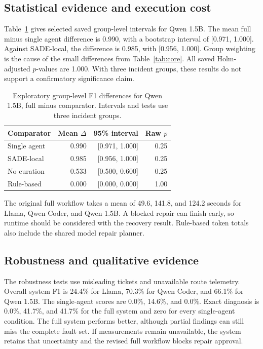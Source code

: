 \documentclass[pdflatex,sn-mathphys-num,iicol]{sn-jnl}
\begin{document}
\subsection{Statistical evidence and execution cost}
Table~\ref{tab:stats} gives selected saved group-level intervals for Qwen 1.5B. The mean full minus single agent difference is 0.990, with a bootstrap interval of [0.971, 1.000]. Against SADE-local, the difference is 0.985, with [0.956, 1.000]. Group weighting is the cause of the small differences from Table~\ref{tab:core}. All saved Holm-adjusted $p$-values are 1.000. With three incident groups, these results do not support a confirmatory significance claim.

\begin{table}[t]
\caption{Exploratory group-level F1 differences for Qwen 1.5B, full minus comparator. Intervals and tests use three incident groups.}\label{tab:stats}
\centering\small
\begin{tabular}{@{}lrrr@{}}
\toprule
Comparator & Mean $\Delta$ & 95\% interval & Raw $p$ \\
\midrule
Single agent & 0.990 & [0.971, 1.000] & 0.25 \\
SADE-local & 0.985 & [0.956, 1.000] & 0.25 \\
No curation & 0.533 & [0.500, 0.600] & 0.25 \\
Rule-based & 0.000 & [0.000, 0.000] & 1.00 \\
\bottomrule
\end{tabular}
\end{table}
The original full workflow takes a mean of 49.6, 141.8, and 124.2 seconds for Llama, Qwen Coder, and Qwen 1.5B. A blocked repair can finish early, so runtime should be considered with the recovery result. Rule-based token totals also include the shared model repair planner.

\subsection{Robustness and qualitative evidence}
The robustness tests use misleading tickets and unavailable route telemetry. Overall system F1 is 24.4\% for Llama, 70.3\% for Qwen Coder, and 66.1\% for Qwen 1.5B. The single-agent scores are 0.0\%, 14.6\%, and 0.0\%. Exact diagnosis is 0.0\%, 41.7\%, and 41.7\% for the full system and zero for every single-agent condition. The full system performs better, although partial findings can still miss the complete fault set. If measurements remain unavailable, the system retains that uncertainty and the revised full workflow blocks repair approval.
\end{document}
